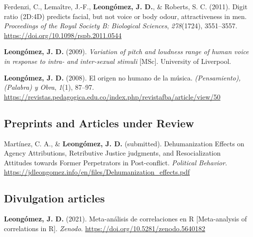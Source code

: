 \documentclass[11pt,a4paper,]{awesome-cv}
\begin{document}
\leavevmode{}%
Ferdenzi, C., Lemaître, J.-F., \textbf{Leongómez, J. D.}, \& Roberts, S.
C. (2011). {Digit ratio (2D:4D) predicts facial, but not voice or body
odour, attractiveness in men.} \emph{Proceedings of the Royal Society B:
Biological Sciences}, \emph{278}(1724), 3551--3557.
\url{https://doi.org/10.1098/rspb.2011.0544}

\leavevmode{}%
\textbf{Leongómez, J. D.} (2009). \emph{{Variation of pitch and loudness
range of human voice in response to intra- and inter-sexual stimuli}}
{[}MSc{]}. University of Liverpool.

\leavevmode{}%
\textbf{Leongómez, J. D.} (2008). {El origen no humano de la m{ú}sica}.
\emph{(Pensamiento), (Palabra) y Obra}, \emph{1}(1), 87--97.
\url{https://revistas.pedagogica.edu.co/index.php/revistafba/article/view/50}

\endgroup

\hypertarget{section-1}{%
\subsection{\texorpdfstring{\textbf{Preprints and Articles under Review}}{}}\label{section-1}}

\begingroup
\setlength{\parindent}{-0.5in}
\setlength{\leftskip}{0.5in}

\hypertarget{refs_working_paper}{}
\leavevmode{}%
Martínez, C. A., \& \textbf{Leongómez, J. D.} (submitted).
Dehumanization {Effects} on {Agency Attributions}, {Retributive Justice}
judgments, and {Resocialization Attitudes} towards {Former Perpetrators}
in {Post}-conflict. \emph{Political Behavior}.
\url{https://jdleongomez.info/en/files/Dehumanization_effects.pdf}

\endgroup

\hypertarget{section-2}{%
\subsection{\texorpdfstring{\textbf{Divulgation articles}}{}}\label{section-2}}

\begingroup
\setlength{\parindent}{-0.5in}
\setlength{\leftskip}{0.5in}

\hypertarget{refs_divulgation}{}
\leavevmode{}%
\textbf{Leongómez, J. D.} (2021). {Meta-análisis de correlaciones en R
{[}Meta-analysis of correlations in R{]}}. \emph{Zenodo}.
\url{https://doi.org/10.5281/zenodo.5640182}
\end{document}
